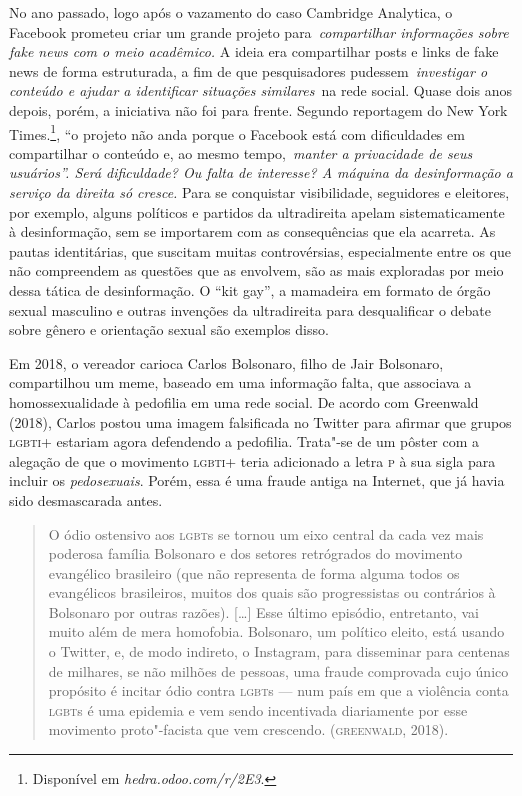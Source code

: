 No ano passado, logo após o vazamento do caso Cambridge Analytica, o
Facebook prometeu criar um grande projeto para~\textit{compartilhar
informações sobre fake news com o meio acadêmico.} A ideia era
compartilhar posts e links de fake news de forma estruturada, a fim de
que pesquisadores pudessem~\textit{investigar o conteúdo e ajudar a
identificar situações similares~}na rede social. Quase dois anos depois,
porém, a iniciativa não foi para frente. Segundo reportagem do New York
Times.\footnote{Disponível em \textit{hedra.odoo.com/r/2E3}.}, ``o projeto não anda porque o Facebook está
com dificuldades em compartilhar o conteúdo e, ao mesmo
tempo,~\textit{manter a privacidade de seus usuários''. Será
dificuldade? Ou falta de interesse? A máquina da desinformação a serviço
da direita só cresce.} Para se conquistar visibilidade, seguidores e
eleitores, por exemplo, alguns políticos e partidos da ultradireita
apelam sistematicamente à desinformação, sem se importarem com as
consequências que ela acarreta. As pautas identitárias, que suscitam
muitas controvérsias, especialmente entre os que não compreendem as
questões que as envolvem, são as mais exploradas por meio dessa tática
de desinformação. O ``kit gay'', a mamadeira em formato de órgão sexual
masculino e outras invenções da ultradireita para desqualificar o debate
sobre gênero e orientação sexual são exemplos disso.

Em 2018, o vereador carioca Carlos Bolsonaro, filho de Jair Bolsonaro,
compartilhou um meme, baseado em uma informação falta, que associava a
homossexualidade à pedofilia em uma rede social. De acordo com Greenwald
(2018), Carlos postou uma imagem falsificada no Twitter para afirmar que
grupos \textsc{lgbti}+ estariam agora defendendo a pedofilia. Trata"-se de um
pôster com a alegação de que o movimento \textsc{lgbti}+ teria adicionado a letra
\textsc{p} à sua sigla para incluir os \textit{pedosexuais}. Porém, essa é uma
fraude antiga na Internet, que já havia sido desmascarada antes.

\begin{quote}
O ódio ostensivo aos \textsc{lgbt}s se tornou um eixo central da cada vez mais
poderosa família Bolsonaro e dos setores retrógrados do movimento
evangélico brasileiro (que não representa de forma alguma todos os
evangélicos brasileiros, muitos dos quais são progressistas ou
contrários à Bolsonaro por outras razões). {[}\ldots{}{]} Esse último
episódio, entretanto, vai muito além de mera homofobia. Bolsonaro, um
político eleito, está usando o Twitter, e, de modo indireto, o
Instagram, para disseminar para centenas de milhares, se não milhões de
pessoas, uma fraude comprovada cujo único propósito é incitar ódio
contra \textsc{lgbt}s --- num país em que a violência conta \textsc{lgbt}s é uma epidemia e
vem sendo incentivada diariamente por esse movimento proto"-facista que
vem crescendo. (\textsc{greenwald}, 2018).
\end{quote}


